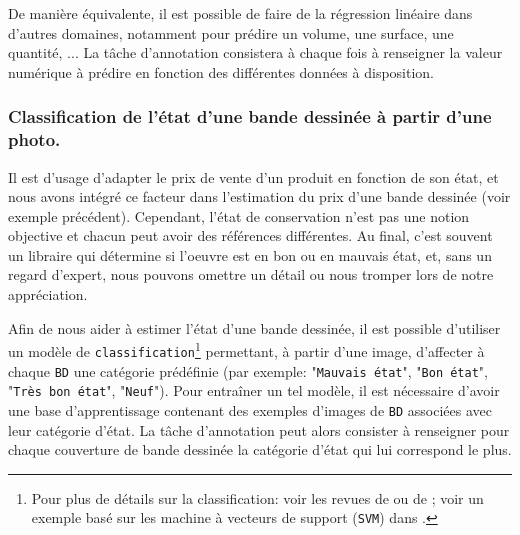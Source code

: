 			\begin{leftBarInformation}
				De manière équivalente, il est possible de faire de la régression linéaire dans d'autres domaines, notamment pour prédire un volume, une surface, une quantité, ...
				La tâche d'annotation consistera à chaque fois à renseigner la valeur numérique à prédire en fonction des différentes données à disposition.
			\end{leftBarInformation}
		
		
		\subsubsection{Classification de l'état d'une bande dessinée à partir d'une photo.}
		\label{section:2.1.2.B-PRESENTATION-ANNOTATION-EXEMPLES-CLASSIFICATION}
			
			Il est d'usage d'adapter le prix de vente d'un produit en fonction de son état, et nous avons intégré ce facteur dans l'estimation du prix d'une bande dessinée (voir exemple précédent).
			Cependant, l'état de conservation n'est pas une notion objective et chacun peut avoir des références différentes.
			Au final, c'est souvent un libraire qui détermine si l'oeuvre est en bon ou en mauvais état, et, sans un regard d'expert, nous pouvons omettre un détail ou nous tromper lors de notre appréciation.
			
			Afin de nous aider à estimer l'état d'une bande dessinée, il est possible d'utiliser un modèle de \texttt{classification}\footnote{
				Pour plus de détails sur la classification: voir les revues de \cite{aized-amin-soofi-arshad-awan:2017:classification-techniques-machine} ou de \cite{kotsiantis-etal:2006:machine-learning-review} ; voir un exemple basé sur les machine à vecteurs de support (\texttt{SVM}) dans \cite{cortes-vapnik:1995:supportvector-networks}.
			} permettant, à partir d'une image, d'affecter à chaque \texttt{BD} une catégorie prédéfinie (par exemple: "\texttt{Mauvais état}", "\texttt{Bon état}", "\texttt{Très bon état}", "\texttt{Neuf}").
			Pour entraîner un tel modèle, il est nécessaire d'avoir une base d'apprentissage contenant des exemples d'images de \texttt{BD} associées avec leur catégorie d'état.
			La tâche d'annotation peut alors consister à renseigner pour chaque couverture de bande dessinée la catégorie d'état qui lui correspond le plus.
			
